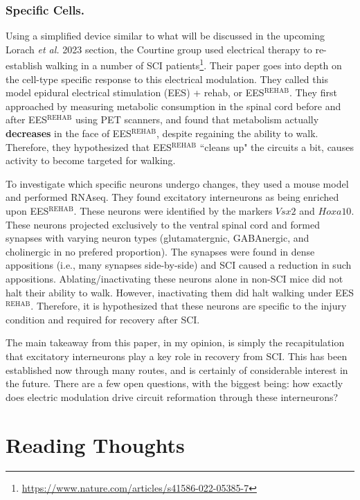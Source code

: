 \documentclass[12pt]{report}
\begin{document}
\subsubsection{Specific Cells.}

Using a simplified device similar to what will be discussed in the upcoming Lorach \textit{et al.} 2023 section, the Courtine group used electrical therapy to re-establish walking in a number of SCI patients\footnote{\url{https://www.nature.com/articles/s41586-022-05385-7}}. Their paper goes into depth on the cell-type specific response to this electrical modulation. They called this model epidural electrical stimulation (EES) + rehab, or EES$^{\mathrm{REHAB}}$. They first approached by measuring metabolic consumption in the spinal cord before and after EES$^{\mathrm{REHAB}}$ using PET scanners, and found that metabolism actually \textbf{decreases} in the face of EES$^{\mathrm{REHAB}}$, despite regaining the ability to walk. Therefore, they hypothesized that EES$^{\mathrm{REHAB}}$ ``cleans up" the circuits a bit, causes activity to become targeted for walking.\newline

To investigate which specific neurons undergo changes, they used a mouse model and performed RNAseq. They found excitatory interneurons as being enriched upon EES$^{\mathrm{REHAB}}$. These neurons were identified by the markers $Vsx2$ and $Hoxa10$. These neurons projected exclusively to the ventral spinal cord and formed synapses with varying neuron types (glutamatergnic, GABAnergic, and cholinergic in no prefered proportion). The synapses were found in dense appositions (i.e., many synapses side-by-side) and SCI caused a reduction in such appositions. Ablating/inactivating these neurons alone in non-SCI mice did not halt their ability to walk. However, inactivating them did halt walking under EES$^{\mathrm{REHAB}}$. Therefore, it is hypothesized that these neurons are specific to the injury condition and required for recovery after SCI.\newline

The main takeaway from this paper, in my opinion, is simply the recapitulation that excitatory interneurons play a key role in recovery from SCI. This has been established now through many routes, and is certainly of considerable interest in the future. There are a few open questions, with the biggest being: how exactly does electric modulation drive circuit reformation through these interneurons? 

\section{Reading Thoughts} 
\end{document}
